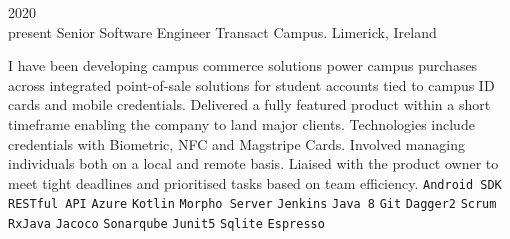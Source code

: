 \documentclass[9pt]{developercv} %
\begin{document}
\begin{entrylist}
	\entry
		{2020\\\footnotesize{present}}
		{Senior Software Engineer}
		{Transact Campus. Limerick, Ireland}
{

I have been developing campus commerce solutions power campus purchases across integrated point-of-sale solutions for student accounts tied to campus ID cards and mobile credentials. Delivered a fully featured product within a short timeframe enabling the company to land major clients. Technologies include credentials with Biometric, NFC and Magstripe Cards. 
\newline
\newline
Involved managing individuals both on a local and remote basis. Liaised with the product owner to meet tight deadlines and prioritised tasks based on team efficiency.
 	{
 		\texttt{Android SDK}\slashsep
		 \texttt{RESTful API}\slashsep
		 \texttt{Azure}\slashsep
		 \texttt{Kotlin}\slashsep
		 \texttt{Morpho Server}\slashsep
		 \texttt{Jenkins}\slashsep
		 \texttt{Java 8}\slashsep
		 \texttt{Git}\slashsep
		 \texttt{Dagger2}\slashsep
		 \texttt{Scrum}\slashsep
		 \texttt{RxJava}\slashsep
		 \texttt{Jacoco}\slashsep
		 \texttt{Sonarqube}\slashsep
		 \texttt{Junit5}\slashsep
		 \texttt{Sqlite}\slashsep
		 \texttt{Espresso}\slashsep
	}
}

\end{entrylist}
\end{document}
